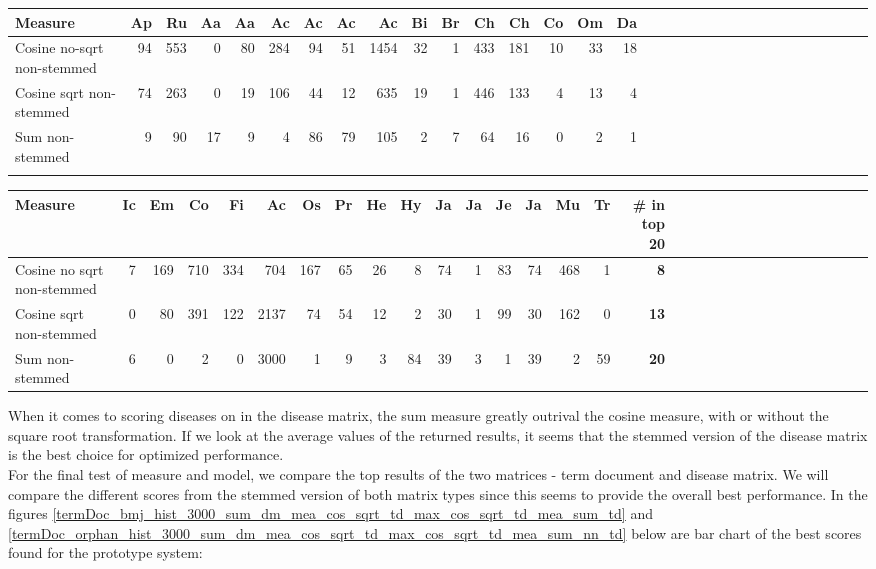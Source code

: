 \begin{table}[H]
\begin{tiny}
  \begin{tabular}{|l|r|r|r|r|r|r|r|r|r|r|r|r|r|r|r|r|r|r|r|r|r|r|r|r|r|r|r|r|r|r|r|}
    \hline
    Measure &Ap&Ru&Aa&Aa&Ac&Ac&Ac&Ac&Bi&Br&Ch&Ch&Co&Om&Da\\
    \hline
    Cosine no-sqrt non-stemmed &94&553&0&80&284&94&51&1454&32&1&433&181&10&33&18 \\
    \hline
    Cosine sqrt non-stemmed &74&263&0&19&106&44&12&635&19&1&446&133&4&13&4 \\
    \hline
    Sum non-stemmed &9&90&17&9&4&86&79&105&2&7&64&16&0&2&1\\
    \hline
    \multicolumn{16}{c}{} \\
    \end{tabular}
    \begin{tabular}{|l|r|r|r|r|r|r|r|r|r|r|r|r|r|r|r|r|r|r|r|r|r|r|r|r|r|r|r|r|r|r|}
    \hline
     Measure &Ic&Em&Co&Fi&Ac&Os&Pr&He&Hy&Ja&Ja&Je&Ja&Mu&Tr &  \scriptsize{\textbf{\# in top 20}} \\
    \hline
     Cosine no sqrt non-stemmed &7&169&710&334&704&167&65&26&8&74&1&83&74&468&1 & \scriptsize{\textbf{8}} \\
    \hline
     Cosine sqrt non-stemmed &0&80&391&122&2137&74&54&12&2&30&1&99&30&162&0 &\scriptsize{\textbf{13}} \\
    \hline
     Sum non-stemmed &6&0&2&0&3000&1&9&3&84&39&3&1&39&2&59 & \scriptsize{\textbf{20}} \\
     \hline
  \end{tabular}
\end{tiny}
\end{table}

When it comes to scoring diseases on in the disease matrix, the sum measure greatly outrival the cosine measure, with or without the square root transformation. If we look at the average values of the returned results, it seems that the stemmed version of the disease matrix is the best choice for optimized performance. \\

For the final test of measure and model, we compare the top results of the two matrices - term document and disease matrix. We will compare the different scores from the stemmed version of both matrix types since this seems to provide the overall best performance. In the figures \ref{termDoc_bmj_hist_3000_sum_dm_mea_cos_sqrt_td_max_cos_sqrt_td_mea_sum_td} and \ref{termDoc_orphan_hist_3000_sum_dm_mea_cos_sqrt_td_max_cos_sqrt_td_mea_sum_nn_td} below are bar chart of the best scores found for the prototype system:

